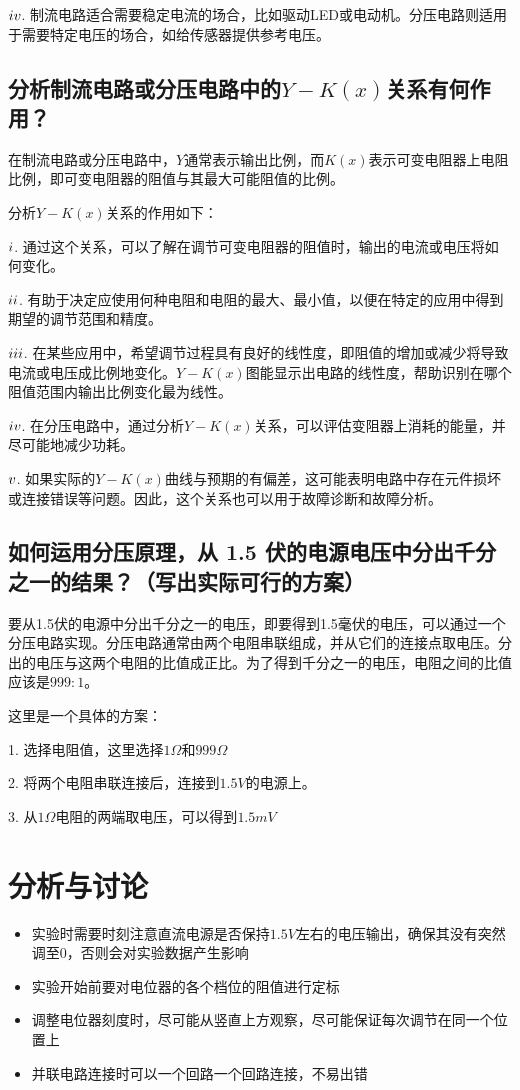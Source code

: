 \documentclass{article}
\begin{document}
$\romannumeral4$. 制流电路适合需要稳定电流的场合，比如驱动LED或电动机。分压电路则适用于需要特定电压的场合，如给传感器提供参考电压。

\subsection{分析制流电路或分压电路中的$Y-K(x)$关系有何作用？}

在制流电路或分压电路中，$Y$通常表示输出比例，而$K(x)$表示可变电阻器上电阻比例，即可变电阻器的阻值与其最大可能阻值的比例。

分析$Y-K(x)$关系的作用如下：

$\romannumeral1$. 通过这个关系，可以了解在调节可变电阻器的阻值时，输出的电流或电压将如何变化。

$\romannumeral2$. 有助于决定应使用何种电阻和电阻的最大、最小值，以便在特定的应用中得到期望的调节范围和精度。

$\romannumeral3$. 在某些应用中，希望调节过程具有良好的线性度，即阻值的增加或减少将导致电流或电压成比例地变化。$Y-K(x)$图能显示出电路的线性度，帮助识别在哪个阻值范围内输出比例变化最为线性。

$\romannumeral4$. 在分压电路中，通过分析$Y-K(x)$关系，可以评估变阻器上消耗的能量，并尽可能地减少功耗。

$\romannumeral5$. 如果实际的$Y-K(x)$曲线与预期的有偏差，这可能表明电路中存在元件损坏或连接错误等问题。因此，这个关系也可以用于故障诊断和故障分析。

\subsection{如何运用分压原理，从 1.5 伏的电源电压中分出千分之一的结果？（写出实际可行的方案）}

要从1.5伏的电源中分出千分之一的电压，即要得到1.5毫伏的电压，可以通过一个分压电路实现。分压电路通常由两个电阻串联组成，并从它们的连接点取电压。分出的电压与这两个电阻的比值成正比。为了得到千分之一的电压，电阻之间的比值应该是$999:1$。

这里是一个具体的方案：

1. 选择电阻值，这里选择$1 \Omega$和$999 \Omega$

2. 将两个电阻串联连接后，连接到$1.5 V$的电源上。

3. 从$1 \Omega$电阻的两端取电压，可以得到$1.5 mV$

\section{分析与讨论}
\begin{itemize}
    \item 实验时需要时刻注意直流电源是否保持$1.5 V$左右的电压输出，确保其没有突然调至0，否则会对实验数据产生影响
    \item 实验开始前要对电位器的各个档位的阻值进行定标
    \item 调整电位器刻度时，尽可能从竖直上方观察，尽可能保证每次调节在同一个位置上
    \item 并联电路连接时可以一个回路一个回路连接，不易出错
\end{itemize}
\end{document}
